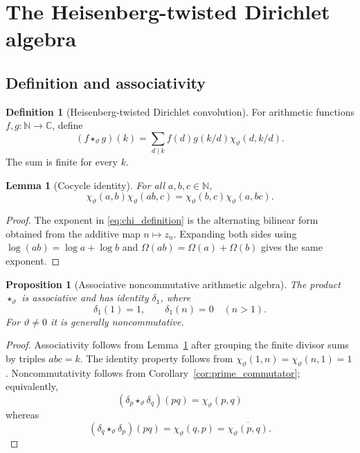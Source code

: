 \documentclass[11pt]{amsart}
\numberwithin{equation}{section}
\theoremstyle{plain}
\newtheorem{proposition}[theorem]{Proposition}
\newtheorem{lemma}[theorem]{Lemma}
\theoremstyle{definition}
\newtheorem{definition}[theorem]{Definition}
\theoremstyle{remark}
\newcommand{\C}{\mathbb{C}}
\newcommand{\N}{\mathbb{N}}
\newcommand{\Om}{\Omega}
\newcommand{\twconv}{\star_{\vartheta}}
\newcommand{\deltaone}{\delta_{1}}
\begin{document}
\section{The Heisenberg-twisted Dirichlet algebra}
\label{sec:twisted_dirichlet_algebra}

\subsection{Definition and associativity}
\label{subsec:twisted_convolution_definition}

\begin{definition}[Heisenberg-twisted Dirichlet convolution]
\label{def:twisted_convolution}
For arithmetic functions $f,g:\N\to\C$, define
\begin{equation}
(f\twconv g)(k)
=
\sum_{d\mid k}
f(d)g(k/d)\chi_{\vartheta}(d,k/d).
\label{eq:twisted_convolution}
\end{equation}
The sum is finite for every $k$.
\end{definition}

\begin{lemma}[Cocycle identity]
\label{lem:cocycle_identity}
For all $a,b,c\in\N$,
\begin{equation}
\chi_{\vartheta}(a,b)\chi_{\vartheta}(ab,c)
=
\chi_{\vartheta}(b,c)\chi_{\vartheta}(a,bc).
\label{eq:cocycle_identity}
\end{equation}
\end{lemma}

\begin{proof}
The exponent in \eqref{eq:chi_definition} is the alternating bilinear form
obtained from the additive map $n\mapsto z_n$.  Expanding both sides using
$\log(ab)=\log a+\log b$ and
$\Om(ab)=\Om(a)+\Om(b)$ gives the same exponent.
\end{proof}

\begin{proposition}[Associative noncommutative arithmetic algebra]
\label{prop:twisted_associative}
The product $\twconv$ is associative and has identity $\deltaone$, where
\begin{equation}
\deltaone(1)=1,
\qquad
\deltaone(n)=0\quad(n>1).
\label{eq:delta_one_definition}
\end{equation}
For $\vartheta\neq0$ it is generally noncommutative.
\end{proposition}

\begin{proof}
Associativity follows from Lemma~\ref{lem:cocycle_identity} after grouping
the finite divisor sums by triples $abc=k$.  The identity property follows
from $\chi_{\vartheta}(1,n)=\chi_{\vartheta}(n,1)=1$.  Noncommutativity
follows from Corollary~\ref{cor:prime_commutator}; equivalently,
\begin{equation}
(\delta_p\twconv\delta_q)(pq)
=
\chi_{\vartheta}(p,q)
\label{eq:delta_pq_forward}
\end{equation}
whereas
\begin{equation}
(\delta_q\twconv\delta_p)(pq)
=
\chi_{\vartheta}(q,p)
=
\overline{\chi_{\vartheta}(p,q)}.
\label{eq:delta_pq_reverse}
\end{equation}
\end{proof}
\end{document}
